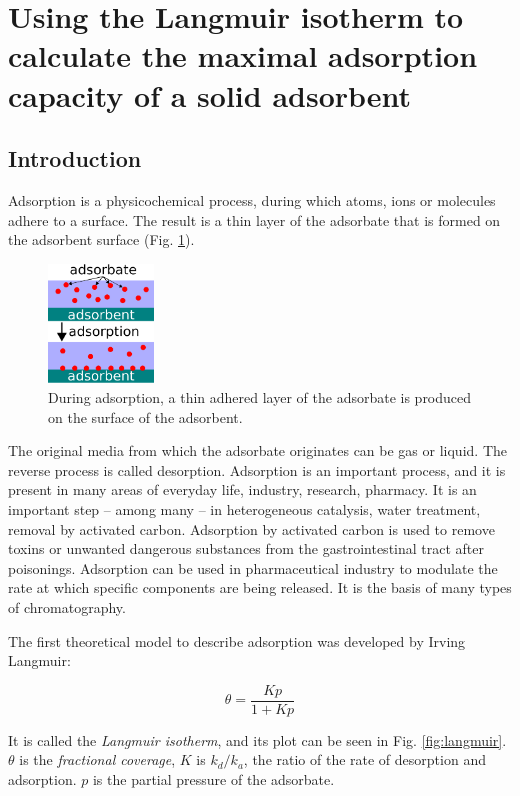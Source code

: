 \section{Using the Langmuir isotherm to calculate the maximal adsorption capacity of a solid adsorbent}
\subsection{Introduction}

Adsorption is a physicochemical process, during which atoms, ions or molecules adhere to a surface.
The result is a thin layer of the adsorbate that is formed on the adsorbent surface (Fig. \ref{fig:adsorption}).
\begin{figure}
\centering
\includegraphics[width=0.25\textwidth]{fig/adsorption.eps}
\caption{During adsorption, a thin adhered layer of the adsorbate is produced on the surface of the adsorbent.}
\label{fig:adsorption}
\end{figure}
The original media from which the adsorbate originates can be gas or liquid.
The reverse process is called desorption.
Adsorption is an important process, and it is present in many areas of everyday life, industry, research, pharmacy.
It is an important step -- among many -- in heterogeneous catalysis, water treatment, removal by activated carbon.
Adsorption by activated carbon is used to remove toxins or unwanted dangerous substances from the gastrointestinal tract after poisonings.
Adsorption can be used in pharmaceutical industry to modulate the rate at which specific components are being released. 
It is the basis of many types of chromatography.

The first theoretical model to describe adsorption was developed by Irving Langmuir:

\begin{equation}
\label{eq:langmuir1}
        \theta
        =
        \frac
                {K p}
                {1 + K p} 
\end{equation}

It is called the \emph{Langmuir isotherm}, and its plot can be seen in Fig. \ref{fig:langmuir}. $\theta$ is the \emph{fractional coverage}, $K$ is $k_d/k_a$, the ratio of the rate of desorption and adsorption. $p$ is the partial pressure of the adsorbate.

